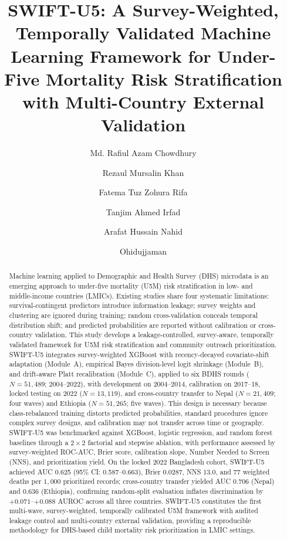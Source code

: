 \documentclass[a4paper,fleqn]{cas-sc}
\begin{document}
\let\WriteBookmarks\relax
\def\printorcid{}


\title[mode=title]{SWIFT-U5: A Survey-Weighted, Temporally Validated Machine Learning Framework for Under-Five Mortality Risk Stratification with Multi-Country External Validation}

\author[1]{Md. Rafiul Azam Chowdhury}
\author[1]{Rezaul Mursalin Khan}
\author[1]{Fatema Tuz Zohura Rifa}
\author[1]{Tanjim Ahmed Irfad}
\author[1]{Arafat Hussain Nahid}
\author[1]{Ohidujjaman}

\begin{abstract}
Machine learning applied to Demographic and Health Survey (DHS) microdata is an emerging approach to under-five mortality (U5M) risk stratification in low- and middle-income countries (LMICs).
Existing studies share four systematic limitations: survival-contingent predictors introduce information leakage; survey weights and clustering are ignored during training; random cross-validation conceals temporal distribution shift; and predicted probabilities are reported without calibration or cross-country validation.
This study develops a leakage-controlled, survey-aware, temporally validated framework for U5M risk stratification and community outreach prioritization.
SWIFT-U5 integrates survey-weighted XGBoost with recency-decayed covariate-shift adaptation (Module~A), empirical Bayes division-level logit shrinkage (Module~B), and drift-aware Platt recalibration (Module~C), applied to six BDHS rounds ($N=51{,}489$; 2004--2022), with development on 2004--2014, calibration on 2017--18, locked testing on 2022 ($N=13{,}119$), and cross-country transfer to Nepal ($N=21{,}409$; four waves) and Ethiopia ($N=51{,}265$; five waves).
This design is necessary because class-rebalanced training distorts predicted probabilities, standard procedures ignore complex survey designs, and calibration may not transfer across time or geography.
SWIFT-U5 was benchmarked against XGBoost, logistic regression, and random forest baselines through a $2\times2$ factorial and stepwise ablation, with performance assessed by survey-weighted ROC-AUC, Brier score, calibration slope, Number Needed to Screen (NNS), and prioritization yield.
On the locked 2022 Bangladesh cohort, SWIFT-U5 achieved AUC 0.625 (95\% CI: 0.587--0.663), Brier 0.0287, NNS 13.0, and 77 weighted deaths per $1{,}000$ prioritized records; cross-country transfer yielded AUC 0.706 (Nepal) and 0.636 (Ethiopia), confirming random-split evaluation inflates discrimination by $+0.071$--$+0.088$ AUROC across all three countries.
SWIFT-U5 constitutes the first multi-wave, survey-weighted, temporally calibrated U5M framework with audited leakage control and multi-country external validation, providing a reproducible methodology for DHS-based child mortality risk prioritization in LMIC settings.
\end{abstract}
\end{document}
